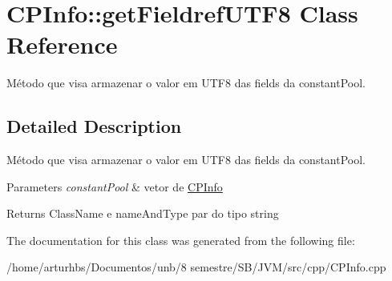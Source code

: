 \hypertarget{classCPInfo_1_1getFieldrefUTF8}{}\section{C\+P\+Info\+:\+:get\+Fieldref\+U\+T\+F8 Class Reference}
\label{classCPInfo_1_1getFieldrefUTF8}


Método que visa armazenar o valor em U\+T\+F8 das fields da constant\+Pool.  




\subsection{Detailed Description}
Método que visa armazenar o valor em U\+T\+F8 das fields da constant\+Pool. 


\begin{DoxyParams}{Parameters}
{\em constant\+Pool} & vetor de \hyperlink{classCPInfo}{C\+P\+Info} \\
\hline
\end{DoxyParams}
\begin{DoxyReturn}{Returns}
Class\+Name e name\+And\+Type par do tipo string 
\end{DoxyReturn}


The documentation for this class was generated from the following file\+:\begin{DoxyCompactItemize}
\item 
/home/arturhbs/\+Documentos/unb/8 semestre/\+S\+B/\+J\+V\+M/src/cpp/C\+P\+Info.\+cpp\end{DoxyCompactItemize}
